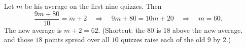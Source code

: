 Let $m$ be his average on the first nine quizzes. Then
\[
\dfrac{9m+80}{10}=m+2\quad\Longrightarrow\quad9m+80=10m+20\quad\Longrightarrow\quad m=60 .
\]
The new average is $m+2=\boxed{62}$. (Shortcut: the $80$ is $18$ above the new average, and those $18$ points spread over all $10$ quizzes raise each of the old $9$ by $2$.)

